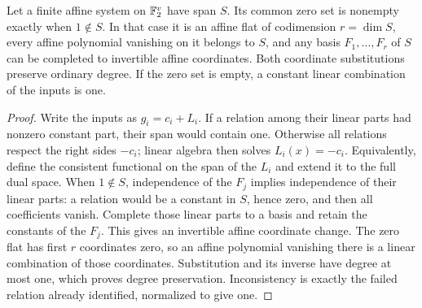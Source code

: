 \begin{lemma}\label{lem:affine-coordinates}
Let a finite affine system on \(\mathbb F_2^v\) have span \(S\).
Its common zero set is nonempty exactly when \(1\notin S\).
In that case it is an affine flat of codimension \(r=\dim S\), every
affine polynomial vanishing on it belongs to \(S\), and any basis
\(F_1,\ldots,F_r\) of \(S\) can be completed to invertible affine
coordinates. Both coordinate substitutions preserve ordinary degree.
If the zero set is empty, a constant linear combination of the inputs is one.
\end{lemma}
\begin{proof}
Write the inputs as \(g_i=c_i+L_i\). If a relation among their linear
parts had nonzero constant part, their span would contain one. Otherwise
all relations respect the right sides \(-c_i\); linear algebra then solves
\(L_i(x)=-c_i\). Equivalently, define the consistent functional on the
span of the \(L_i\) and extend it to the full dual space.
When \(1\notin S\), independence of the \(F_j\) implies independence
of their linear parts: a relation would be a constant in \(S\), hence
zero, and then all coefficients vanish. Complete those linear parts to a
basis and retain the constants of the \(F_j\). This gives an invertible
affine coordinate change. The zero flat has first \(r\) coordinates zero,
so an affine polynomial vanishing there is a linear combination of those
coordinates. Substitution and its inverse have degree at most one,
which proves degree preservation. Inconsistency is exactly the failed
relation already identified, normalized to give one.
\end{proof}

